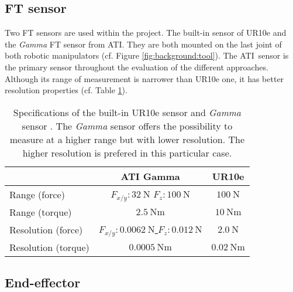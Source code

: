 \documentclass[/home/francois/latex/report/main.tex]{subfiles}
\begin{document}
\subsection{\ac{FT} sensor}

Two \ac{FT} sensors are used within the project. The built-in sensor of UR10e and the \textit{Gamma} \ac{FT} sensor from ATI\texttrademark \cite{ati}. They are both mounted on the last joint of both robotic manipulators (cf. Figure \ref{fig:background:tool}). The ATI\texttrademark \ sensor is the primary sensor throughout the evaluation of the different approaches. Although its range of measurement is narrower than UR10e one, it has better resolution properties (cf. Table \ref{tab:background:ft-sensor}).

\begin{table}[h]
  \begin{center}
    \renewcommand{\arraystretch}{1.8} %
    \begin{tabular}{l|c|c} %
      & \textbf{ATI Gamma} & \textbf{UR10e}\\
      \hline
      Range (force)  & $F_{x/y}: 32 \ \si{\newton}$ $F_z: 100 \ \si{\newton}$ & \underline{$100 \ \si{\newton}$} \\
      \hline
      Range (torque)  & $2.5 \ \si{\newton} \si{\meter}$ & \underline{$10 \ \si{\newton} \si{\meter}$} \\
      \hline
      Resolution (force)  & \underline{$F_{x/y}: 0.0062 \ \si{\newton}$ $F_z: 0.012 \ \si{\newton}$} & $2.0 \ \si{\newton}$ \\
      \hline
      Resolution (torque)  & \underline{$0.0005 \ \si{\newton} \si{\meter}$} & $0.02 \ \si{\newton} \si{\meter}$ \\
      \hline
    \end{tabular}
  \end{center}
  \caption{Specifications of the built-in UR10e sensor and \textit{Gamma} sensor \cite{ati, ur10e}. The \textit{Gamma} sensor offers the possibility to measure at a higher range but with lower resolution. The higher resolution is prefered in this particular case.\label{tab:background:ft-sensor}}
\end{table}

\subsection{End-effector}
\end{document}
